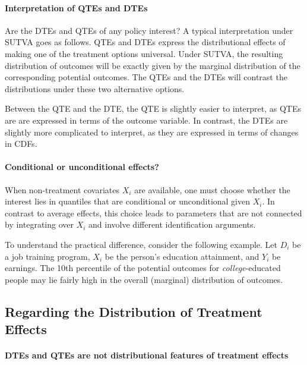  
   
 \paragraph{Interpretation of QTEs and DTEs}
 
 Are the DTEs and QTEs of any policy interest?  A typical interpretation under SUTVA goes as follows.   QTEs and DTEs express the distributional effects of making one of the treatment options universal. Under SUTVA, the resulting distribution of outcomes will be exactly given by the marginal distribution of the corresponding potential outcomes. The QTEs and the DTEs will contrast the distributions under these two alternative options. 
 
 Between the QTE and the DTE, the QTE is slightly easier to interpret, as QTEs are are expressed in terms of the outcome variable. In contrast, the DTEs are slightly more complicated to interpret, as they are expressed in terms of changes in CDFs.
 
 
 
 
 \paragraph{Conditional  or unconditional effects?}
 
 When non-treatment covariates $X_i$ are available, one must   choose whether the interest lies in quantiles that are conditional or unconditional given $X_i$.  In contrast to average effects, this choice leads to parameters that are not connected by integrating over $X_i$ and involve different identification arguments. 
 
To understand the practical difference, consider the following example.  Let $D_i$ be a job training program, $X_i$ be the person's education attainment, and $Y_i$ be earnings. The 10th percentile of the potential outcomes for \emph{college}-educated people may lie fairly high in the overall (marginal) distribution of outcomes.
 
 

\subsection{Regarding the Distribution of Treatment Effects}
  

  
  
 
\paragraph{DTEs and QTEs are not distributional features of treatment effects}

